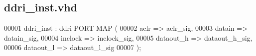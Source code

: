 \subsection{ddri\+\_\+inst.\+vhd}
\label{ddri__inst_8vhd_source}

\begin{DoxyCode}
00001 ddri\_inst : ddri \textcolor{keywordflow}{PORT} \textcolor{keywordflow}{MAP} (
00002         aclr     => aclr\_sig,
00003         datain   => datain\_sig,
00004         inclock  => inclock\_sig,
00005         dataout_h    => dataout\_h\_sig,
00006         dataout_l    => dataout\_l\_sig
00007     \textcolor{vhdlchar}{)};
\end{DoxyCode}
